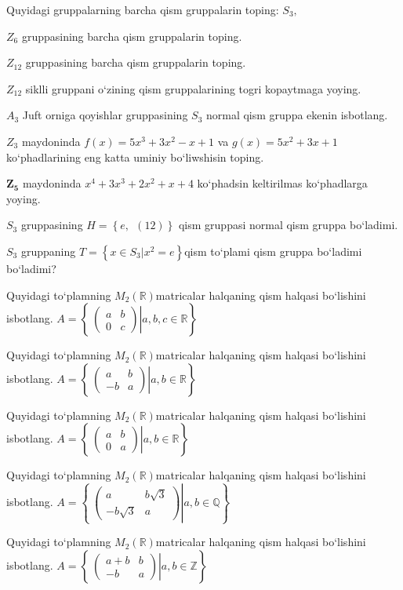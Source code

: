 Quyidagi gruppalarning barcha qism gruppalarin toping: \(S_{3},\)

\(Z_{6}\) gruppasining barcha qism gruppalarin toping.

\(Z_{12}\) gruppasining barcha qism gruppalarin toping.

\(Z_{12}\) siklli gruppani o`zining qism gruppalarining tog\textquotesingle ri kopaytmaga yoying.

\(A_{3}\) Juft orniga qoyishlar gruppasining \(S_{3}\) normal qism gruppa ekenin isbotlang.

\(Z_{3}\) maydoninda \(f(x) = 5x^{3} + 3x^{2} - x + 1\) va \(g(x) = 5x^{2} + 3x + 1\) ko`phadlarining eng katta uminiy bo`liwshisin toping.

\(\mathbf{Z}_{\mathbf{5}}\) maydoninda \(x^{4} + 3x^{3} + 2x^{2} + x + 4\) ko`phadsin keltirilmas ko`phadlarga yoying.

\(S_{3}\) gruppasining \(H = \left\{ e,\ \ (12) \right\}\) qism gruppasi normal qism gruppa bo`ladimi.

\(S_{3}\) gruppaning \(T = \left\{ x \in S_{3}|x^{2} = e \right\}\)qism to`plami qism gruppa bo`ladimi bo`ladimi?

Quyidagi to`plamning \(M_{2}(\mathbb{R})\)matricalar halqaning qism halqasi bo`lishini isbotlang. \(A = \left\{ \left. \ \begin{pmatrix}
a & b \\
0 & c
\end{pmatrix} \right|a,b,c\mathbb{\in R} \right\}\)

Quyidagi to`plamning \(M_{2}(\mathbb{R})\)matricalar halqaning qism halqasi bo`lishini isbotlang. \(A = \left\{ \left. \ \begin{pmatrix}
a & b \\
 - b & a
\end{pmatrix} \right|a,b\mathbb{\in R} \right\}\)

Quyidagi to`plamning \(M_{2}(\mathbb{R})\)matricalar halqaning qism halqasi bo`lishini isbotlang. \(A = \left\{ \left. \ \begin{pmatrix}
a & b \\
0 & a
\end{pmatrix} \right|a,b\mathbb{\in R} \right\}\)

Quyidagi to`plamning \(M_{2}(\mathbb{R})\)matricalar halqaning qism halqasi bo`lishini isbotlang. \(A = \left\{ \left. \ \begin{pmatrix}
a & b\sqrt{3} \\
 - b\sqrt{3} & a
\end{pmatrix} \right|a,b\mathbb{\in Q} \right\}\)

Quyidagi to`plamning \(M_{2}(\mathbb{R})\)matricalar halqaning qism halqasi bo`lishini isbotlang. \(A = \left\{ \left. \ \begin{pmatrix}
a + b & b \\
 - b & a
\end{pmatrix} \right|a,b\mathbb{\in Z} \right\}\)